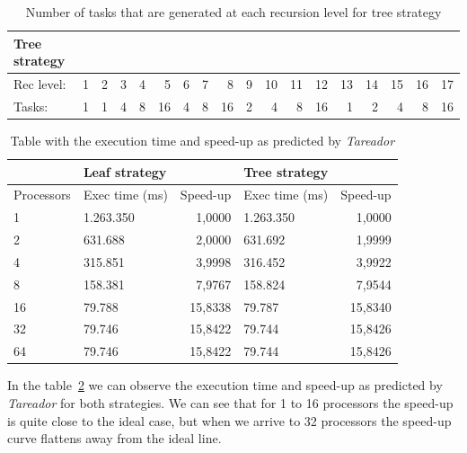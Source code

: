 \begin{table}[H]
\centering
\begin{tabular}{lrrrrrrrrrrrrrrrrr}
\toprule
Tree strategy & & & & & & & & & & & & & & & & &\\
\midrule
Rec level:        & 1     & 2     & 3     & 4     & 5     & 6     & 7     & 8     & 9     & 10    & 11    & 12    & 13    & 14    & 15    & 16    & 17  \\
Tasks:    & 1     & 1     & 4     & 8     & 16    & 4     & 8     & 16    & 2     & 4     & 8     & 16    & 1     & 2     & 4     & 8    & 16 \\
\bottomrule
\end{tabular}

\caption{Number of tasks that are generated at each recursion level for tree strategy} 
\label{tab:tree_tasks-rec_level}
\end{table}

\begin{table}[H]
\centering
\begin{tabular}{llrlr}
\toprule
           & Leaf strategy &           & Tree strategy &           \\
\midrule
Processors & Exec time (ms)& Speed-up  & Exec time (ms)& Speed-up  \\
\midrule
1          & 1.263.350     & 1,0000    & 1.263.350     & 1,0000    \\
2          & 631.688       & 2,0000    & 631.692       & 1,9999    \\
4          & 315.851       & 3,9998    & 316.452       & 3,9922    \\
8          & 158.381       & 7,9767    & 158.824       & 7,9544    \\
16         & 79.788        & 15,8338   & 79.787        & 15,8340   \\
32         & 79.746        & 15,8422   & 79.744        & 15,8426   \\
64         & 79.746        & 15,8422   & 79.744        & 15,8426   \\
\bottomrule
\end{tabular}
\caption{Table with the execution time and speed-up as predicted by \emph{Tareador}} 
\label{tab:Exec_time-Speed-up}
\end{table}

In the table~\ref{tab:Exec_time-Speed-up} we can observe the execution time and speed-up as predicted by \emph{Tareador} for both strategies. We can see that for 1 to 16 processors the speed-up is quite close to the ideal case, but when we arrive to 32 processors the speed-up curve flattens away from the ideal line.

